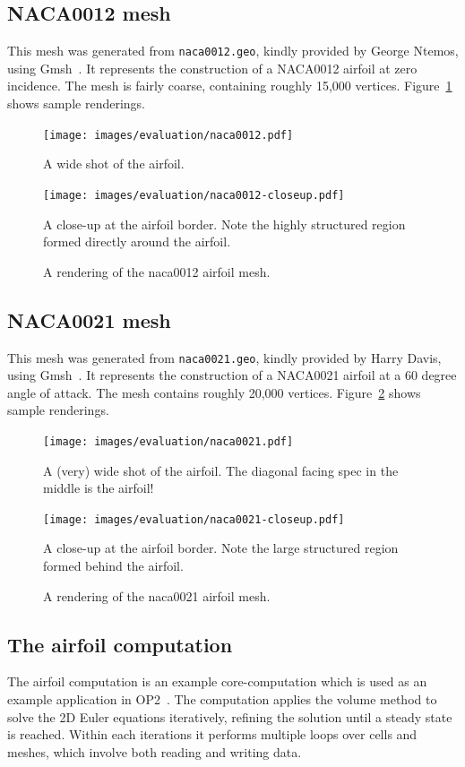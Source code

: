 \subsection{NACA0012 mesh}
This mesh was generated from \texttt{naca0012.geo}, kindly provided by George Ntemos, using Gmsh~\cite{geuzaine2008gmsh}. It represents the construction of a NACA0012 airfoil at zero incidence. The mesh is fairly coarse, containing roughly 15,000 vertices. Figure~\ref{fig:naca0012-mesh} shows sample renderings.

\begin{figure}
\sidebysidevertical
{
  \texttt{[image: images/evaluation/naca0012.pdf]}
  \caption{A wide shot of the airfoil.}
}
{
  \texttt{[image: images/evaluation/naca0012-closeup.pdf]}
  \caption{A close-up at the airfoil border. Note the highly structured region formed directly around the airfoil.}
}
\caption{A rendering of the naca0012 airfoil mesh.}
\label{fig:naca0012-mesh}
\end{figure}

\subsection{NACA0021 mesh}
This mesh was generated from \texttt{naca0021.geo}, kindly provided by Harry Davis, using Gmsh~\cite{geuzaine2008gmsh}. It represents the construction of a NACA0021 airfoil at a 60 degree angle of attack. The mesh contains roughly 20,000 vertices. Figure~\ref{fig:naca0021-mesh} shows sample renderings.

\begin{figure}
\sidebysidevertical
{
  \texttt{[image: images/evaluation/naca0021.pdf]}
  \caption{A (very) wide shot of the airfoil. The diagonal facing spec in the middle is the airfoil!}
}
{
  \texttt{[image: images/evaluation/naca0021-closeup.pdf]}
  \caption{A close-up at the airfoil border. Note the large structured region formed behind the airfoil.}
}
\caption{A rendering of the naca0021 airfoil mesh.}
\label{fig:naca0021-mesh}
\end{figure}


\subsection{The airfoil computation}
The airfoil computation is an example core-computation which is used as an example application in OP2~\cite{op2airfoil}. The computation applies the volume method to solve the 2D Euler equations iteratively, refining the solution until a steady state is reached. Within each iterations it performs multiple loops over cells and meshes, which involve both reading and writing data.


